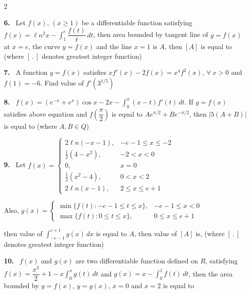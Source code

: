 \documentclass[10pt]{extarticle}
\newcommand{\qn}[1]{\par\smallskip\noindent\textbf{#1.}~}
\begin{document}
\begin{multicols}{2}
\qn{6} Let $f(x)$, $(x\ge1)$ be a differentiable function satisfying $f(x)=\ell n^2x-\displaystyle\int_1^{e}\dfrac{f(t)}{t}\,dt$, then area bounded by tangent line of $y=f(x)$ at $x=e$, the curve $y=f(x)$ and the line $x=1$ is $A$, then $[A]$ is equal to (where $[\,.\,]$ denotes greatest integer function)
\qn{7} A function $y=f(x)$ satisfies $xf'(x)-2f(x)=x^4f^2(x)$, $\forall\ x>0$ and $f(1)=-6$. Find value of $f'\left(3^{1/5}\right)$
\qn{8} $f(x)=\left(e^{-x}+e^{x}\right)\cos x-2x-\displaystyle\int_0^{x}(x-t)f'(t)\,dt$. If $y=f(x)$ satisfies above equation and $f\left(\dfrac{\pi}{2}\right)$ is equal to $Ae^{\pi/2}+Be^{-\pi/2}$, then $|5(A+B)|$ is equal to (where $A,B\in Q$)
\qn{9} Let $f(x)=\begin{cases}2\ell n(-x-1), & -e-1\le x\le-2\\[2pt] \frac12(4-x^2), & -2<x<0\\[2pt] 0, & x=0\\[2pt] \frac12(x^2-4), & 0<x<2\\[2pt] 2\ell n(x-1), & 2\le x\le e+1\end{cases}$\par
Also, {\small$g(x)=\begin{cases}\min\{f(t):-e-1\le t\le x\}, & -e-1\le x<0\\[2pt] \max\{f(t):0\le t\le x\}, & 0\le x\le e+1\end{cases}$}\par
then value of $\displaystyle\int_{-e-1}^{e+1}g(x)\,dx$ is equal to $A$, then value of $[A]$ is, (where $[\,.\,]$ denotes greatest integer function)
\qn{10} $f(x)$ and $g(x)$ are two differentiable function defined on $R$, satisfying $f(x)=\dfrac{x^3}{2}+1-x\displaystyle\int_0^{x}g(t)\,dt$ and $g(x)=x-\displaystyle\int_0^{1}f(t)\,dt$, then the area bounded by $y=f(x)$, $y=g(x)$, $x=0$ and $x=2$ is equal to
\end{multicols}
\end{document}
